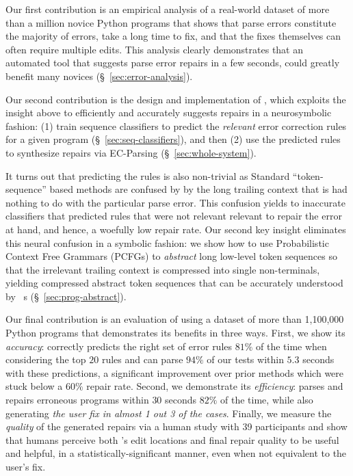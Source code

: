 %
Our first contribution is an empirical analysis of a real-world
dataset of more than a million novice Python programs that shows
that parse errors constitute the majority of errors, take a long
time to fix, and that the fixes themselves can often require
multiple edits.
%
This analysis clearly demonstrates that an automated tool that
suggests parse error repairs in a few seconds, could greatly
benefit many novices (\S~\ref{sec:error-analysis}).

%
Our second contribution is the design and implementation
of \toolname, which exploits the insight above to
efficiently and accurately suggests repairs in a
neurosymbolic fashion:
%
(1) train sequence classifiers to predict the \emph{relevant}
error correction rules for a given program (\S~\ref{sec:seq-classifiers}), and then
%
(2) use the predicted rules to synthesize repairs
via EC-Parsing (\S~\ref{sec:whole-system}).

%
It turns out that predicting the rules is also non-trivial as
Standard ``token-sequence'' based methods are confused by
by the long trailing context that is had nothing to do with
the particular parse error.
%
This confusion yields to inaccurate classifiers that
predicted rules that were not relevant relevant to
repair the error at hand, and hence, a woefully low
repair rate.
%
Our second key insight eliminates this neural confusion
in a symbolic fashion: we show how to use
Probabilistic Context Free Grammars (PCFGs)
to \emph{abstract} long low-level token sequences so that
the irrelevant trailing context is compressed into single
non-terminals, yielding compressed abstract token sequences
that can be accurately understood by \dnn~s
(\S~\ref{sec:prog-abstract}).


%
Our final contribution is an evaluation of \toolname
using a dataset of more than 1,100,000 Python programs
that demonstrates its benefits in three ways.
%
First, we show its \emph{accuracy}: \toolname correctly predicts
the right set of error rules $81\%$ of the time when considering the top $20$
rules and can parse $94\%$ of our tests within $5.3$ seconds with these
predictions, a significant improvement over prior methods
which were stuck below a $60\%$ repair rate.
%
Second, we demonstrate its \emph{efficiency}: \toolname
parses and repairs erroneous programs within $30$ seconds $82\%$ of the time,
while also generating \emph{the user fix in almost 1 out 3 of the cases}.
%
Finally, we measure the \emph{quality} of the generated repairs via a human study
with 39 participants and show that humans perceive both \toolname's edit
locations and final repair quality to be useful and helpful,
in a statistically-significant manner, even when not equivalent to the user's fix.


